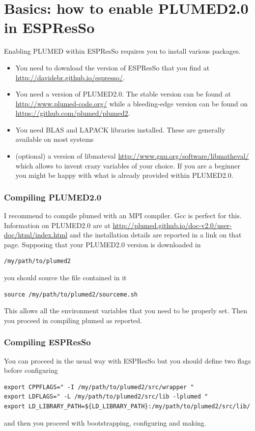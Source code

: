 \documentclass[10pt,fleqn,a4paper]{report}
\begin{document}
\chapter{Basics: how to enable PLUMED2.0 in ESPResSo}

Enabling PLUMED within ESPResSo requires you to install various packages.
\begin{itemize} 
\item You need to download the version of ESPResSo that you find at 
\url{http://davidebr.github.io/espresso/}. 
\item You need a version of PLUMED2.0. The stable version can be found at 
\url{http://www.plumed-code.org/} while a bleeding-edge version can be found on
\url{https://github.com/plumed/plumed2}.
\item You need BLAS and LAPACK libraries installed. These are generally available on most systems
\item (optional) a version of libmateval \url{http://www.gnu.org/software/libmatheval/} which allows to invent crazy variables of your choice. If you are a beginner you might be happy with what is already provided within PLUMED2.0.
\end{itemize}

\subsection{Compiling PLUMED2.0}
I recommend to compile plumed with an MPI compiler. Gcc is perfect for this.
Information on PLUMED2.0 are at \url{http://plumed.github.io/doc-v2.0/user-doc/html/index.html} and the installation details are reported in a link on that page. 
Supposing that your PLUMED2.0 version is downloaded in
\begin{verbatim}
/my/path/to/plumed2
\end{verbatim}
you should source the file contained in it
\begin{verbatim}
source /my/path/to/plumed2/sourceme.sh
\end{verbatim}
This allows all the environment variables that you need to be properly set.
Then you proceed in compiling plumed as reported.

\subsection{Compiling ESPResSo}
You can proceed in the usual way with ESPResSo but you should define two flags before configuring
\begin{verbatim}
export CPPFLAGS=" -I /my/path/to/plumed2/src/wrapper "
export LDFLAGS=" -L /my/path/to/plumed2/src/lib -lplumed "
export LD_LIBRARY_PATH=${LD_LIBRARY_PATH}:/my/path/to/plumed2/src/lib/
\end{verbatim}
and then you proceed with bootstrapping, configuring and making.
\end{document}
